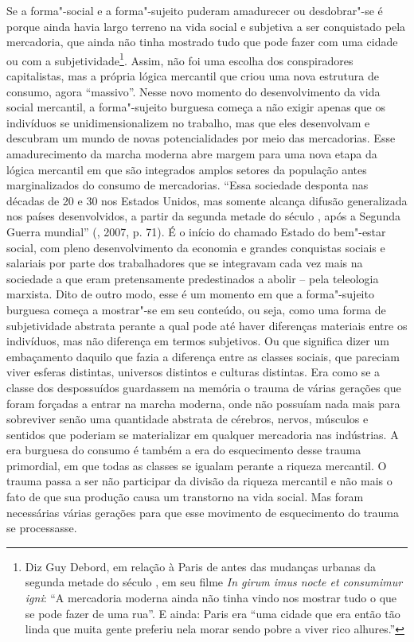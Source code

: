 Se a forma"-social e a forma"-sujeito puderam amadurecer ou desdobrar"-se é
porque ainda havia largo terreno na vida social e subjetiva a ser
conquistado pela mercadoria, que ainda não tinha mostrado tudo que pode
fazer com uma cidade ou com a subjetividade\footnote{Diz Guy Debord, em
  relação à Paris de antes das mudanças urbanas da segunda metade do
  século , em seu filme \emph{In girum imus nocte et consumimur igni}:
  ``A mercadoria moderna ainda não tinha vindo nos mostrar tudo o que se
  pode fazer de uma rua''. E ainda: Paris era ``uma cidade que era então
  tão linda que muita gente preferiu nela morar sendo pobre a viver rico
  alhures.''}. Assim, não foi uma escolha dos conspiradores
capitalistas, mas a própria lógica mercantil que criou uma nova
estrutura de consumo, agora ``massivo''. Nesse novo momento do
desenvolvimento da vida social mercantil, a forma"-sujeito burguesa
começa a não exigir apenas que os indivíduos se unidimensionalizem no
trabalho, mas que eles desenvolvam e descubram um mundo de novas
potencialidades por meio das mercadorias. Esse amadurecimento da marcha
moderna abre margem para uma nova etapa da lógica mercantil em que são
integrados amplos setores da população antes marginalizados do consumo
de mercadorias. ``Essa sociedade desponta nas décadas de 20 e 30 nos
Estados Unidos, mas somente alcança difusão generalizada nos países
desenvolvidos, a partir da segunda metade do século , após a Segunda
Guerra mundial'' (, 2007, p. 71). É o início do chamado Estado
do bem"-estar social, com pleno desenvolvimento da economia e grandes
conquistas sociais e salariais por parte dos trabalhadores que se
integravam cada vez mais na sociedade a que eram pretensamente
predestinados a abolir -- pela teleologia marxista. Dito de outro modo,
esse é um momento em que a forma"-sujeito burguesa começa a mostrar"-se em
seu conteúdo, ou seja, como uma forma de subjetividade abstrata perante
a qual pode até haver diferenças materiais entre os indivíduos, mas não
diferença em termos subjetivos. Ou que significa dizer um embaçamento
daquilo que fazia a diferença entre as classes sociais, que pareciam
viver esferas distintas, universos distintos e culturas distintas. Era
como se a classe dos despossuídos guardassem na memória o trauma de
várias gerações que foram forçadas a entrar na marcha moderna, onde não
possuíam nada mais para sobreviver senão uma quantidade abstrata de
cérebros, nervos, músculos e sentidos que poderiam se materializar em
qualquer mercadoria nas indústrias. A era burguesa do consumo é também a
era do esquecimento desse trauma primordial, em que todas as classes se
igualam perante a riqueza mercantil. O trauma passa a ser não participar
da divisão da riqueza mercantil e não mais o fato de que sua produção
causa um transtorno na vida social. Mas foram necessárias várias
gerações para que esse movimento de esquecimento do trauma se
processasse.


